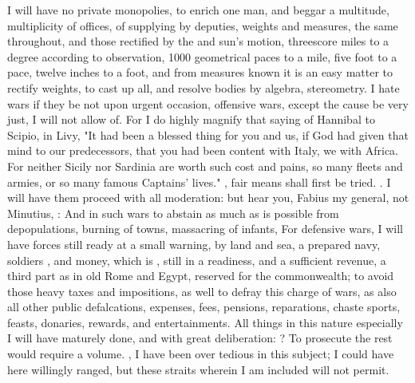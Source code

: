 I will have no private monopolies, to enrich one man, and beggar a multitude,
multiplicity of offices, of supplying by deputies, weights
and measures, the same throughout, and those rectified by the  and sun's motion, threescore miles to a degree according to
observation, 1000 geometrical paces to a mile, five foot to a pace, twelve
inches to a foot, \etc{} and from measures known it is an easy matter to
rectify weights, \etc{} to cast up all, and resolve bodies by algebra,
stereometry. I hate wars if they be not  upon urgent
occasion,  offensive wars, except the cause be very just, I
will not allow of. For I do highly magnify that saying of Hannibal to Scipio,
in Livy, "It had been a blessed thing for you and us, if
God had given that mind to our predecessors, that you had been content with
Italy, we with Africa. For neither Sicily nor Sardinia are worth such cost and
pains, so many fleets and armies, or so many famous Captains' lives." , fair means shall first be tried.
. I
will have them proceed with all moderation: but hear you, Fabius my general,
not Minutius, : And in such wars to abstain as
much as is possible from depopulations, burning of towns,
massacring of infants, \etc{} For defensive wars, I will have forces still
ready at a small warning, by land and sea, a prepared navy, soldiers , and money, which is , still in a readiness,
and a sufficient revenue, a third part as in old Rome and
Egypt, reserved for the commonwealth; to avoid those heavy taxes and
impositions, as well to defray this charge of wars, as also all other public
defalcations, expenses, fees, pensions, reparations, chaste sports, feasts,
donaries, rewards, and entertainments. All things in this nature especially I
will have maturely done, and with great deliberation:
? To prosecute the rest would require a volume. , I have been over tedious in this subject; I could have here willingly
ranged, but these straits wherein I am included will not permit.

